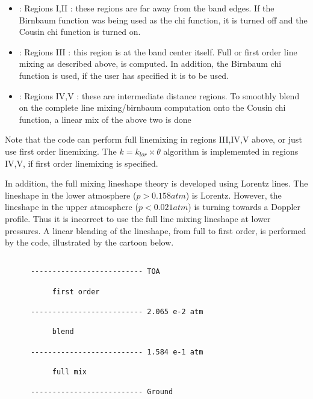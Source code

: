 \documentclass[11pt]{article}
\begin{document}
\begin{itemize}
\item : Regions I,II  : these regions are far away from the band edges. If the
                        Birnbaum function was being used as the chi function, 
                        it is turned off and the Cousin chi function is turned 
                        on. 
\item : Regions III   : this region is at the band center itself. Full or 
                        first order line mixing as described above, is 
                        computed. In addition, the Birnbaum chi function is 
                        used, if the user has specified it is to be used.\\
\item : Regions IV,V  : these are intermediate distance regions. To smoothly
                        blend on the complete line mixing/birnbaum computation
                        onto the Cousin chi function, a linear  mix of the 
                        above two is done\\
\end{itemize}

Note that the code can perform full linemixing in regions III,IV,V above, 
or just use first order linemixing. The $k=k_{lor} \times \theta$ algorithm
is implememted in regions IV,V, if first order linemixing is specified. 

In addition, the full mixing lineshape theory is developed using Lorentz lines.
The lineshape in the lower atmosphere ($p > 0.158 atm$) is Lorentz. However,
the lineshape in the upper atmosphere ($p < 0.021 atm$) is turning towards a 
Doppler profile. Thus it is incorrect to use the full line mixing lineshape 
at lower pressures. A linear blending of the lineshape, from full to first
order, is performed by the code, illustrated by the cartoon below. 

\begin{verbatim}

      -------------------------- TOA

           first order

      -------------------------- 2.065 e-2 atm

           blend

      -------------------------- 1.584 e-1 atm

           full mix

      -------------------------- Ground
                      
\end{verbatim}
\end{document}
